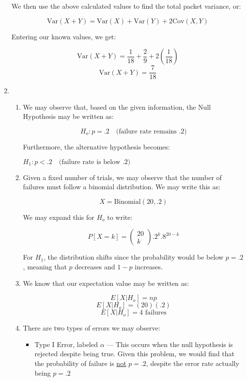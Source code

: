 \begin{enumerate}
    We then use the above calculated values to find the total packet variance, or:

    $$\text{Var}(X+Y)=\text{Var}(X)+\text{Var}(Y)+2\text{Cov}(X,Y)$$

    Entering our known values, we get:

    $$\text{Var}(X+Y)=\frac{1}{18}+\frac{2}{9}+2\left( \frac{1}{18} \right)$$
    $$\boxed{\text{Var}(X+Y)=\frac{7}{18}}$$

  \item

    \begin{enumerate}

      \item We may observe that, based on the given information, the Null Hypothesis may be written as:

        $$\boxed{H_o: p=.2\quad\text{(failure rate remains .2)}}$$

        Furthermore, the alternative hypothesis becomes:

        $\boxed{H_1: p<.2\quad\text{(failure rate is below .2)}}$

      \item Given a fixed number of trials, we may observe that the number of failures must follow a binomial distribution. We may write this as:

        $$X=\text{Binomial}(20,.2)$$

        We may expand this for $H_o$ to write:

        $$\boxed{P[X=k]=\left( \begin{matrix} 20\\k\end{matrix} \right).2^k.8^{20-k}}$$

        For $H_1$, the distribution shifts since the probability would be below $p=.2$, meaning that $p$ decreases and $1-p$ increases.

      \item We know that our expectation value may be written as:

        $$E[X|H_o]=np$$
        $$E[X|H_o]=(20)(.2)$$
        $$\boxed{E[X|H_o]=4\text{ failures}}$$

      \item There are two types of errors we may observe:

        \begin{itemize}

          \item Type I Error, labeled $\alpha$ — This occurs when the null hypothesis is rejected despite being true. Given this problem, we would find that the probability of failure is \underline{not} $p=.2$, despite the error rate actually being $p=.2$


\end{itemize}
\end{enumerate}
\end{enumerate}
